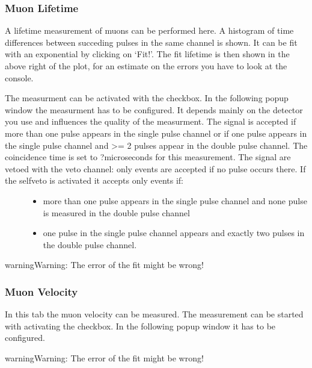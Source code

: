 \documentclass[letterpaper,10pt,english]{sphinxmanual}
\begin{document}
\subsubsection{Muon Lifetime}
\label{tutorial:muon-lifetime}
A lifetime measurement of muons can be performed here. A histogram of time differences between succeding pulses in the same channel is shown. It can be fit with an exponential by clicking on `Fit!'. The fit lifetime is then shown in the above right of the plot, for an estimate on the errors you have to look at the console.
\begin{description}
\item[{The measurment can be activated with the checkbox. In the following popup window the measurment has to be configured. It depends mainly on the detector you use and influences the quality of the measurment. The signal is accepted if more than one pulse appears in the single pulse channel or if one pulse appears in the single pulse channel and \textgreater{}= 2 pulses appear in the double pulse channel. The coincidence time is set to ?microseconds for this measurement. The signal are vetoed with the veto channel: only events are accepted if no pulse occurs there. If the selfveto is activated it accepts only events if:}] \leavevmode\begin{itemize}
\item {} 
more than one pulse appears in the single pulse channel and none pulse is measured in the double pulse channel

\item {} 
one pulse in the single pulse channel appears and exactly two pulses in the double pulse channel.

\end{itemize}

\end{description}

\begin{notice}{warning}{Warning:}
The error of the fit might be wrong!
\end{notice}


\subsubsection{Muon Velocity}
\label{tutorial:muon-velocity}
In this tab the muon velocity can be measured. The measurement can be started with activating the checkbox. In the following popup window it has to be configured.

\begin{notice}{warning}{Warning:}
The error of the fit might be wrong!
\end{notice}
\end{document}
